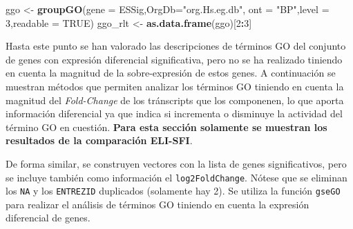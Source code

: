 \documentclass[
]{article}
\newenvironment{Shaded}{\begin{snugshade}}{\end{snugshade}}
\newcommand{\DataTypeTok}[1]{\textcolor[rgb]{0.13,0.29,0.53}{#1}}
\newcommand{\DecValTok}[1]{\textcolor[rgb]{0.00,0.00,0.81}{#1}}
\newcommand{\KeywordTok}[1]{\textcolor[rgb]{0.13,0.29,0.53}{\textbf{#1}}}
\newcommand{\NormalTok}[1]{#1}
\newcommand{\OperatorTok}[1]{\textcolor[rgb]{0.81,0.36,0.00}{\textbf{#1}}}
\newcommand{\OtherTok}[1]{\textcolor[rgb]{0.56,0.35,0.01}{#1}}
\newcommand{\StringTok}[1]{\textcolor[rgb]{0.31,0.60,0.02}{#1}}
\begin{document}
\begin{Shaded}
\begin{Highlighting}[]
\NormalTok{ggo <-}\StringTok{ }\KeywordTok{groupGO}\NormalTok{(}\DataTypeTok{gene =}\NormalTok{ ESSig,}\DataTypeTok{OrgDb=}\StringTok{"org.Hs.eg.db"}\NormalTok{, }\DataTypeTok{ont =} \StringTok{"BP"}\NormalTok{,}\DataTypeTok{level =} \DecValTok{3}\NormalTok{,}\DataTypeTok{readable =} \OtherTok{TRUE}\NormalTok{)}
\NormalTok{ggo_rlt <-}\StringTok{ }\KeywordTok{as.data.frame}\NormalTok{(ggo)[}\DecValTok{2}\OperatorTok{:}\DecValTok{3}\NormalTok{]}
\end{Highlighting}
\end{Shaded}

\begin{Shaded}
\end{Shaded}

Hasta este punto se han valorado las descripciones de términos GO del
conjunto de genes con expresión diferencial significativa, pero no se ha
realizado tiniendo en cuenta la magnitud de la sobre-expresión de estos
genes. A continuación se muestran métodos que permiten analizar los
términos GO tiniendo en cuenta la magnitud del \emph{Fold-Change} de los
tránscripts que los componenen, lo que aporta información diferencial ya
que indica si incrementa o disminuye la actividad del término GO en
cuestión. \textbf{Para esta sección solamente se muestran los resultados
de la comparación ELI-SFI}.

De forma similar, se construyen vectores con la lista de genes
significativos, pero se incluye también como información el
\texttt{log2FoldChange}. Nótese que se eliminan los \texttt{NA} y los
\texttt{ENTREZID} duplicados (solamente hay 2). Se utiliza la función
\texttt{gseGO} para realizar el análisis de términos GO tiniendo en
cuenta la expresión diferencial de genes.
\end{document}
